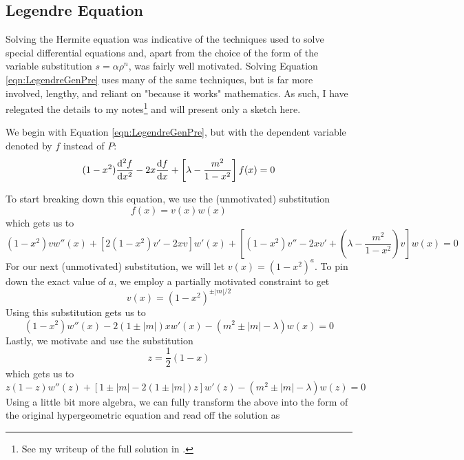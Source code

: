 \documentclass[titlepage]{article}
\numberwithin{equation}{section}
\begin{document}
\subsection{Legendre Equation}
Solving the Hermite equation was indicative of the techniques used to solve special differential equations and, apart from the choice of the form of the variable substitution $s=\alpha\rho^n$, was fairly well motivated. Solving Equation \ref{eqn:LegendreGenPre} uses many of the same techniques, but is far more involved, lengthy, and reliant on "because it works" mathematics. As such, I have relegated the details to my notes\footnote{See my writeup of the full solution in \textcite[27-34]{bib:FinalProject}.} and will present only a sketch here.\par
We begin with Equation \ref{eqn:LegendreGenPre}, but with the dependent variable denoted by $f$ instead of $P$:
\begin{equation*}
    (1-x^2)\dv[2]{f}{x}-2x\dv{f}{x}+\left[ \lambda-\frac{m^2}{1-x^2} \right]f(x) = 0
\end{equation*}\par
To start breaking down this equation, we use the (unmotivated) substitution
\begin{equation*}
    f(x) = v(x)w(x)
\end{equation*}
which gets us to
\begin{equation*}
    (1-x^2)vw''(x)+[2(1-x^2)v'-2xv]w'(x)+\left[ (1-x^2)v''-2xv'+\left( \lambda-\frac{m^2}{1-x^2} \right)v \right]w(x) = 0
\end{equation*}
For our next (unmotivated) substitution, we will let $v(x)=(1-x^2)^a$. To pin down the exact value of $a$, we employ a partially motivated constraint to get
\begin{equation*}
    v(x) = (1-x^2)^{\pm|m|/2}
\end{equation*}
Using this substitution gets us to
\begin{equation*}
    (1-x^2)w''(x)-2(1\pm|m|)xw'(x)-(m^2\pm|m|-\lambda)w(x) = 0
\end{equation*}
Lastly, we motivate and use the substitution
\begin{equation*}
    z = \frac{1}{2}(1-x)
\end{equation*}
which gets us to
\begin{equation*}
    z(1-z)w''(z)+[1\pm|m|-2(1\pm|m|)z]w'(z)-(m^2\pm|m|-\lambda)w(z) = 0
\end{equation*}
Using a little bit more algebra, we can fully transform the above into the form of the original hypergeometric equation and read off the solution as
\end{document}
